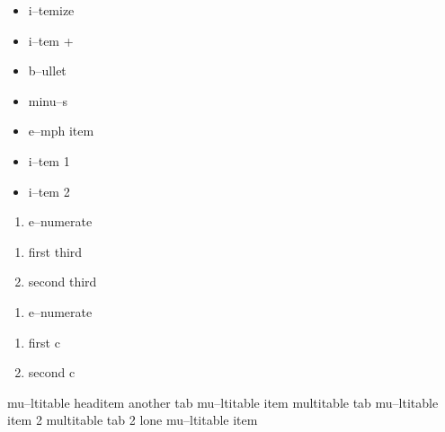 \documentclass{book}
\begin{document}
\begin{titlepage}
\begin{itemize}
\item i--temize
\end{itemize}

\begin{itemize}[label=+]
\item i--tem +
\end{itemize}

\begin{itemize}[label=\textbullet{}]
\item b--ullet
\end{itemize}

\begin{itemize}[label=-]
\item minu--s
\end{itemize}

\begin{itemize}[label=\emph{after emph}]
\item e--mph item
\end{itemize}

\begin{itemize}[label=\textbullet{} a--n itemize line]
\item {}%
i--tem 1
\item i--tem 2
\end{itemize}

\begin{enumerate}[start=1]
\item e--numerate
\end{enumerate}

\begin{enumerate}[start=3]
\item first third
\item second third
\end{enumerate}

\begin{enumerate}[label=\alph*.]
\item e--numerate
\end{enumerate}

\begin{enumerate}[label=\alph*.,start=3]
\item first c
\item second c
\end{enumerate}

mu--ltitable headitem another tab
mu--ltitable item multitable tab
mu--ltitable item 2 multitable tab 2
%
lone mu--ltitable item


\end{titlepage}
\end{document}
